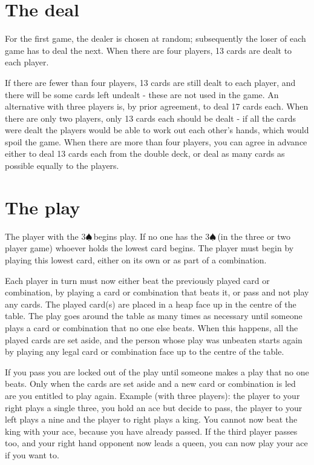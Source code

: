 \documentclass[12pt]{article}
\newcommand{\spade}{$\spadesuit$\,}
\begin{document}
\section{The deal}


For the first game, the dealer is chosen at random; subsequently the loser of each game has to deal the next. When there are four players, 13 cards are dealt to each player.

If there are fewer than four players, 13 cards are still dealt to each player, and there will be some cards left undealt - these are not used in the game. An alternative with three players is, by prior agreement, to deal 17 cards each. When there are only two players, only 13 cards each should be dealt - if all the cards were dealt the players would be able to work out each other's hands, which would spoil the game. When there are more than four players, you can agree in advance either to deal 13 cards each from the double deck, or deal as many cards as possible equally to the players.


\section{The play}

The player with the 3\spade begins play. If no one has the 3\spade (in the three or two player game) whoever holds the lowest card begins. The player must begin by playing this lowest card, either on its own or as part of a combination.

Each player in turn must now either beat the previously played card or combination, by playing a card or combination that beats it, or pass and not play any cards. The played card(s) are placed in a heap face up in the centre of the table. The play goes around the table as many times as necessary until someone plays a card or combination that no one else beats. When this happens, all the played cards are set aside, and the person whose play was unbeaten starts again by playing any legal card or combination face up to the centre of the table.

If you pass you are locked out of the play until someone makes a play that no one beats. Only when the cards are set aside and a new card or combination is led are you entitled to play again.
Example (with three players): the player to your right plays a single three, you hold an ace but decide to pass, the player to your left plays a nine and the player to right plays a king. You cannot now beat the king with your ace, because you have already passed. If the third player passes too, and your right hand opponent now leads a queen, you can now play your ace if you want to.
\end{document}
